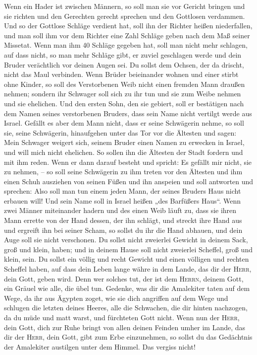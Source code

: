  Wenn ein Hader ist zwischen Männern, so soll man sie vor
Gericht bringen und sie richten und den Gerechten gerecht sprechen und
den Gottlosen verdammen.  Und so der Gottlose Schläge
verdient hat, soll ihn der Richter heißen niederfallen, und man soll ihm
vor dem Richter eine Zahl Schläge geben nach dem Maß seiner Missetat.
 Wenn man ihm 40 Schläge gegeben hat, soll man nicht mehr
schlagen, auf dass nicht, so man mehr Schläge gibt, er zuviel geschlagen
werde und dein Bruder verächtlich vor deinen Augen sei. 
Du sollst dem Ochsen, der da drischt, nicht das Maul verbinden.
 Wenn Brüder beieinander wohnen und einer stirbt ohne
Kinder, so soll des Verstorbenen Weib nicht einen fremden Mann draußen
nehmen; sondern ihr Schwager soll sich zu ihr tun und sie zum Weibe
nehmen und sie ehelichen.  Und den ersten Sohn, den sie
gebiert, soll er bestätigen nach dem Namen seines verstorbenen Bruders,
dass sein Name nicht vertilgt werde aus Israel.  Gefällt
es aber dem Mann nicht, dass er seine Schwägerin nehme, so soll sie,
seine Schwägerin, hinaufgehen unter das Tor vor die Ältesten und sagen:
Mein Schwager weigert sich, seinem Bruder einen Namen zu erwecken in
Israel, und will mich nicht ehelichen.  So sollen ihn die
Ältesten der Stadt fordern und mit ihm reden. Wenn er dann darauf
besteht und spricht: Es gefällt mir nicht, sie zu nehmen, --
 so soll seine Schwägerin zu ihm treten vor den Ältesten
und ihm einen Schuh ausziehen von seinen Füßen und ihn anspeien und soll
antworten und sprechen: Also soll man tun einem jeden Mann, der seines
Bruders Haus nicht erbauen will!  Und sein Name soll in
Israel heißen „des Barfüßers Haus``.  Wenn zwei Männer
miteinander hadern und des einen Weib läuft zu, dass sie ihren Mann
errette von der Hand dessen, der ihn schlägt, und streckt ihre Hand aus
und ergreift ihn bei seiner Scham,  so sollst du ihr die
Hand abhauen, und dein Auge soll sie nicht verschonen. 
Du sollst nicht zweierlei Gewicht in deinem Sack, groß und klein, haben;
 und in deinem Hause soll nicht zweierlei Scheffel, groß
und klein, sein.  Du sollst ein völlig und recht Gewicht
und einen völligen und rechten Scheffel haben, auf dass dein Leben lange
währe in dem Lande, das dir der \textsc{Herr}, dein Gott, geben wird.
 Denn wer solches tut, der ist dem \textsc{Herrn}, deinem
Gott, ein Gräuel wie alle, die übel tun.  Gedenke, was
dir die Amalekiter taten auf dem Wege, da ihr aus Ägypten zoget,
 wie sie dich angriffen auf dem Wege und schlugen die
letzten deines Heeres, alle die Schwachen, die dir hinten nachzogen, da
du müde und matt warst, und fürchteten Gott nicht.  Wenn
nun der \textsc{Herr}, dein Gott, dich zur Ruhe bringt von allen deinen
Feinden umher im Lande, das dir der \textsc{Herr}, dein Gott, gibt zum
Erbe einzunehmen, so sollst du das Gedächtnis der Amalekiter austilgen
unter dem Himmel. Das vergiss nicht!

